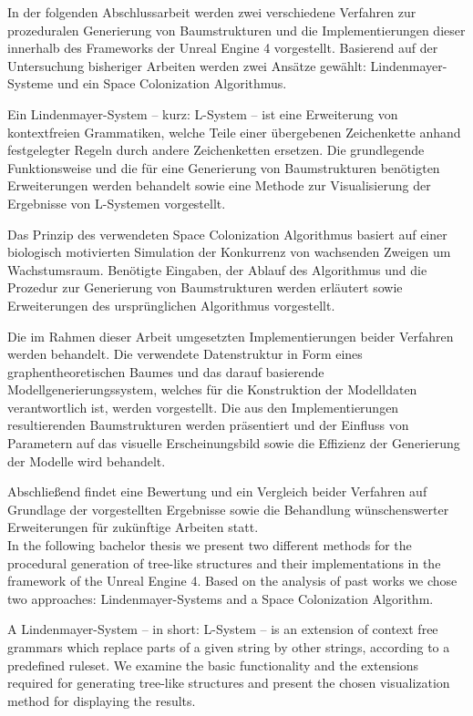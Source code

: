 \kurzfassung

In der folgenden Abschlussarbeit werden zwei verschiedene Verfahren zur prozeduralen Generierung von Baumstrukturen und die Implementierungen dieser innerhalb des Frameworks der Unreal Engine 4 vorgestellt. Basierend auf der Untersuchung bisheriger Arbeiten werden zwei Ansätze gewählt: Lindenmayer-Systeme und ein Space Colonization Algorithmus.

Ein Lindenmayer-System -- kurz: L-System -- ist eine Erweiterung von kontextfreien Grammatiken, welche Teile einer übergebenen Zeichenkette anhand festgelegter Regeln durch andere Zeichenketten ersetzen. \cite[S.2]{ABOP:04} Die grundlegende Funktionsweise und die für eine Generierung von Baumstrukturen benötigten Erweiterungen werden behandelt sowie eine Methode zur Visualisierung der Ergebnisse von L-Systemen vorgestellt.

Das Prinzip des verwendeten Space Colonization Algorithmus basiert auf einer biologisch motivierten Simulation der Konkurrenz von wachsenden Zweigen um Wachstumsraum. \cite[S.2f]{SpaceColonizationAlgorithm:07} Benötigte Eingaben, der Ablauf des Algorithmus und die Prozedur zur Generierung von Baumstrukturen werden erläutert sowie Erweiterungen des ursprünglichen Algorithmus vorgestellt.

Die im Rahmen dieser Arbeit umgesetzten Implementierungen beider Verfahren werden behandelt. Die verwendete Datenstruktur in Form eines graphentheoretischen Baumes und das darauf basierende Modellgenerierungssystem, welches für die Konstruktion der Modelldaten verantwortlich ist, werden vorgestellt. Die aus den Implementierungen resultierenden Baumstrukturen werden präsentiert und der Einfluss von Parametern auf das visuelle Erscheinungsbild sowie die Effizienz der Generierung der Modelle wird behandelt. 

Abschließend findet eine Bewertung und ein Vergleich beider Verfahren auf Grundlage der vorgestellten Ergebnisse sowie die Behandlung wünschenswerter Erweiterungen für zukünftige Arbeiten statt.\\
 
 In the following bachelor thesis we present two different methods for the procedural generation of tree-like structures and their implementations in the framework of the Unreal Engine 4. Based on the analysis of past works we chose two approaches: Lindenmayer-Systems and a Space Colonization Algorithm.
 
 A Lindenmayer-System -- in short: L-System -- is an extension of context free grammars which replace parts of a given string by other strings, according to a predefined ruleset. \cite[S.2]{ABOP:04} We examine the basic functionality and the extensions required for generating  tree-like structures and present the chosen visualization method for displaying the results.
 
